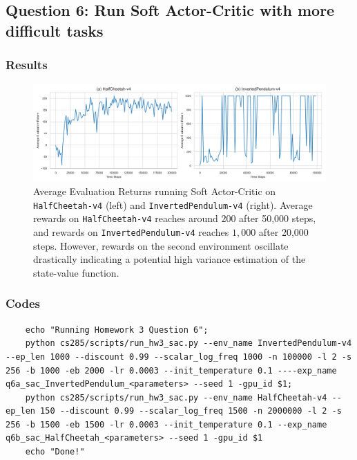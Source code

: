 \documentclass[10pt, letterpaper]{article}
\begin{document}
\subsection*{Question 6: Run Soft Actor-Critic with more difficult tasks}
\subsubsection*{Results}
\begin{figure}[thbp]
    \centering 
    \includegraphics[width=\textwidth]{img/q6.png}
    \caption{Average Evaluation Returns running Soft Actor-Critic on \texttt{HalfCheetah-v4} (left) and \texttt{InvertedPendulum-v4} (right). Average rewards on \texttt{HalfCheetah-v4} reaches around $200$ after 50,000 steps, and rewards on \texttt{InvertedPendulum-v4} reaches $1,000$ after 20,000 steps. However, rewards on the second environment oscillate drastically indicating a potential high variance estimation of the state-value function.}
    \label{fig:6}
\end{figure}
\subsubsection*{Codes}
\begin{lstlisting}
    echo "Running Homework 3 Question 6";
    python cs285/scripts/run_hw3_sac.py --env_name InvertedPendulum-v4 --ep_len 1000 --discount 0.99 --scalar_log_freq 1000 -n 100000 -l 2 -s 256 -b 1000 -eb 2000 -lr 0.0003 --init_temperature 0.1 ----exp_name q6a_sac_InvertedPendulum_<parameters> --seed 1 -gpu_id $1;
    python cs285/scripts/run_hw3_sac.py --env_name HalfCheetah-v4 --ep_len 150 --discount 0.99 --scalar_log_freq 1500 -n 2000000 -l 2 -s 256 -b 1500 -eb 1500 -lr 0.0003 --init_temperature 0.1 --exp_name q6b_sac_HalfCheetah_<parameters> --seed 1 -gpu_id $1
    echo "Done!"
\end{lstlisting}
\end{document}
